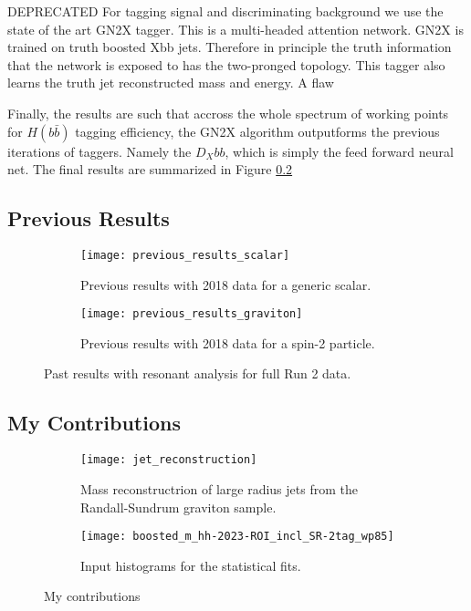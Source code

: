 \documentclass[12pt]{article}
\begin{document}
\vspace{10pt}
DEPRECATED
For tagging signal and discriminating background we use the state of the art
GN2X tagger. This is a multi-headed attention network. GN2X\* is trained on
truth boosted Xbb jets. Therefore in principle the truth information that the
network is exposed to has the two-pronged topology. This tagger also learns the
truth jet reconstructed mass and energy. A flaw 

Finally, the results are such that accross the whole spectrum of working points
for $H(b\bar{b})$ tagging efficiency, the GN2X algorithm outputforms the
previous iterations of taggers. Namely the $D_Xbb$, which is simply the feed
forward neural net. The final results are summarized in Figure \ref{}

\newpage
\subsection{Previous Results}
\begin{figure}[t]
    \centering
    \begin{subfigure}[t]{.48\textwidth}
        \centering
        \texttt{[image: previous\_results\_scalar]}
        \caption{Previous results with 2018 data for a generic scalar.}
        \label{subfig:previous_results_scalar}
    \end{subfigure}
    \hfill
    \begin{subfigure}[t]{.48\textwidth}
        \centering
        \texttt{[image: previous\_results\_graviton]}
        \caption{Previous results with 2018 data for a spin-2 particle.}
        \label{subfig:previous_results_graviton}
    \end{subfigure}
\caption{Past results with resonant analysis for full Run 2 data.}
\label{fig:previous_results}
\end{figure}


\newpage
\subsection{My Contributions}

\begin{figure}[t]
    \centering
    \begin{subfigure}[t]{.48\textwidth}
        \centering
        \texttt{[image: jet\_reconstruction]}
        \caption{Mass reconstructrion of large radius jets from the Randall-Sundrum graviton sample.}
        \label{subfig:jet_reconstruction}
    \end{subfigure}
    \hfill
    \begin{subfigure}[t]{.48\textwidth}
        \centering
        \texttt{[image: boosted\_m\_hh-2023-ROI\_incl\_SR-2tag\_wp85]}
        \caption{Input histograms for the statistical fits.}
        \label{subfig:input_hists}
    \end{subfigure}
\caption{My contributions}
\label{fig:my_contributions}
\end{figure}
\end{document}
